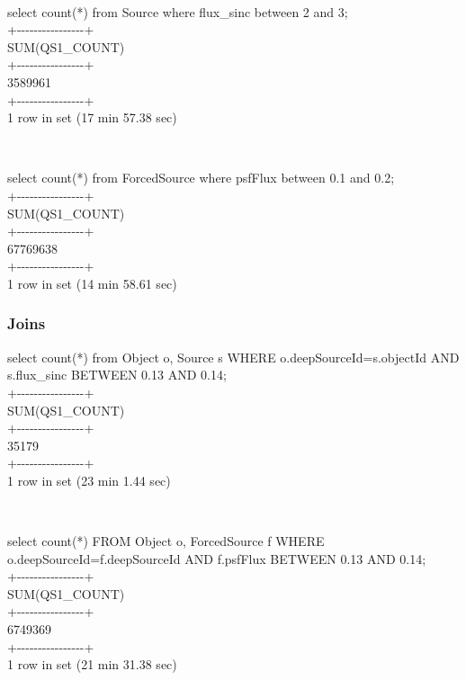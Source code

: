 ~

select count(*) from Source where flux\_sinc between 2 and 3;\\
+-\/-\/-\/-\/-\/-\/-\/-\/-\/-\/-\/-\/-\/-\/-\/-+\\
\textbar{} SUM(QS1\_COUNT) \textbar{}\\
+-\/-\/-\/-\/-\/-\/-\/-\/-\/-\/-\/-\/-\/-\/-\/-+\\
\textbar{} 3589961 \textbar{}\\
+-\/-\/-\/-\/-\/-\/-\/-\/-\/-\/-\/-\/-\/-\/-\/-+\\
1 row in set (17 min 57.38 sec)

~

select count(*) from ForcedSource where psfFlux between 0.1 and 0.2;\\
+-\/-\/-\/-\/-\/-\/-\/-\/-\/-\/-\/-\/-\/-\/-\/-+\\
\textbar{} SUM(QS1\_COUNT) \textbar{}\\
+-\/-\/-\/-\/-\/-\/-\/-\/-\/-\/-\/-\/-\/-\/-\/-+\\
\textbar{} 67769638 \textbar{}\\
+-\/-\/-\/-\/-\/-\/-\/-\/-\/-\/-\/-\/-\/-\/-\/-+\\
1 row in set (14 min 58.61 sec)

\subsubsection{Joins}\label{joins}

select count(*) from Object o, Source s WHERE o.deepSourceId=s.objectId
AND s.flux\_sinc BETWEEN 0.13 AND 0.14;\\
+-\/-\/-\/-\/-\/-\/-\/-\/-\/-\/-\/-\/-\/-\/-\/-+\\
\textbar{} SUM(QS1\_COUNT) \textbar{}\\
+-\/-\/-\/-\/-\/-\/-\/-\/-\/-\/-\/-\/-\/-\/-\/-+\\
\textbar{} 35179 \textbar{}\\
+-\/-\/-\/-\/-\/-\/-\/-\/-\/-\/-\/-\/-\/-\/-\/-+\\
1 row in set (23 min 1.44 sec)

~

select count(*) FROM Object o, ForcedSource f WHERE
o.deepSourceId=f.deepSourceId AND f.psfFlux BETWEEN 0.13 AND 0.14;\\
+-\/-\/-\/-\/-\/-\/-\/-\/-\/-\/-\/-\/-\/-\/-\/-+\\
\textbar{} SUM(QS1\_COUNT) \textbar{}\\
+-\/-\/-\/-\/-\/-\/-\/-\/-\/-\/-\/-\/-\/-\/-\/-+\\
\textbar{} 6749369 \textbar{}\\
+-\/-\/-\/-\/-\/-\/-\/-\/-\/-\/-\/-\/-\/-\/-\/-+\\
1 row in set (21 min 31.38 sec)

